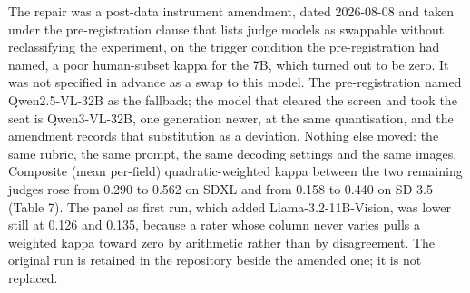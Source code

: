 \documentclass[11pt]{article}
\begin{document}
The repair was a post-data instrument amendment, dated 2026-08-08 and taken
under the pre-registration clause that lists judge models as swappable without
reclassifying the experiment, on the trigger condition the pre-registration had
named, a poor human-subset kappa for the 7B, which turned out to be zero. It was
not specified in advance as a swap to this model. The pre-registration named
Qwen2.5-VL-32B as the fallback; the model that cleared the screen and took the
seat is Qwen3-VL-32B, one generation newer, at the same quantisation, and the
amendment records that substitution as a deviation. Nothing else moved: the same
rubric, the same prompt, the same decoding settings and the same images.
Composite (mean per-field) quadratic-weighted kappa between the two remaining
judges rose from 0.290 to 0.562 on SDXL and from 0.158 to 0.440 on SD 3.5 (Table
7). The panel as first run, which added Llama-3.2-11B-Vision, was lower still at
0.126 and 0.135, because a rater whose column never varies pulls a weighted
kappa toward zero by arithmetic rather than by disagreement. The original run is
retained in the repository beside the amended one; it is not replaced.
\end{document}
